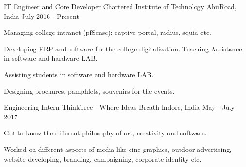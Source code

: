 \begin{cventries}
  \cventry
	{IT Engineer and Core Developer} %
	{\href{http://citabu.ac.in/}{Chartered Institute of Technology}} %
	{AbuRoad, India} %
	{July 2016 - Present} %
	{
		\begin{cvitems} %
			\item {Managing college intranet (pfSense): captive portal, radius, squid etc.}
			\item {Developing ERP and software for the college digitalization. Teaching Assistance in software and hardware LAB.}
			\item {Assisting students in software and hardware LAB.}
			\item {Designing brochures, pamphlets, souvenirs for the events.}
		\end{cvitems}
	}
  \cventry
    {Engineering Intern} %
    {ThinkTree - Where Ideas Breath} %
    {Indore, India} %
    {May - July 2017 } %
    {
      \begin{cvitems} %
        \item {Got to know the different philosophy of art, creativity and software.}
        \item {Worked on different aspects of media like cine graphics, outdoor advertising, website developing, branding, campaigning, corporate identity etc.}
      \end{cvitems}
    }

\end{cventries}
